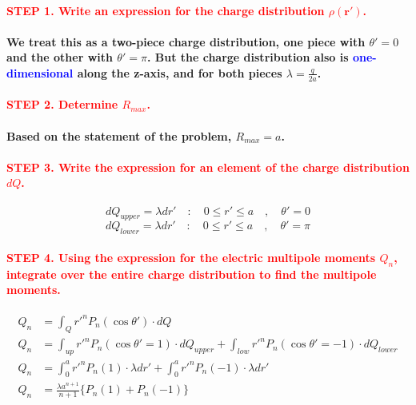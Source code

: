\documentclass{article}
\begin{document}
\paragraph{\textcolor{red}{STEP 1. Write an expression for the charge distribution $\rho(\boldsymbol{r}')$.}}
\paragraph{\indent We treat this as a two-piece charge distribution, one piece with $\theta'=0$ and the other with $\theta'=\pi$. But the charge distribution also is \textcolor{blue}{one-dimensional} along the z-axis, and for both pieces $\lambda=\frac{q}{2a}$.}
\paragraph{\textcolor{red}{STEP 2. Determine $R_{max}$.}}
\paragraph{\indent Based on the statement of the problem, $R_{max}=a$.}
\paragraph{\textcolor{red}{STEP 3. Write the expression for an element of the charge distribution $dQ$.}}
\begin{equation*}
    dQ_{upper}=\lambda dr'\quad :\quad 0\leq r'\leq a \quad, \quad \theta'=0
\end{equation*}
\begin{equation*}
    dQ_{lower}=\lambda dr'\quad :\quad 0\leq r' \leq a \quad, \quad \theta'=\pi
\end{equation*}
\paragraph{\textcolor{red}{STEP 4. Using the expression for the electric multipole moments $Q_n$, integrate over the entire charge distribution to find the multipole moments.}}
\begin{align*}
    Q_n&=\int_Q r'^nP_n(\cos\theta')\cdot dQ\\
    Q_n&=\int_{up}r'^n P_n(\cos\theta'=1)\cdot dQ_{upper} +\int_{low}r'^nP_n(\cos\theta'=-1)\cdot dQ_{lower}\\
    Q_n&=\int_0^a r'^nP_n(1)\cdot \lambda dr'+\int_0^a r'^nP_n(-1)\cdot \lambda dr'\\
    Q_n&=\frac{\lambda a^{n+1}}{n+1}\{P_n(1)+P_n(-1)\}
\end{align*}
\end{document}
